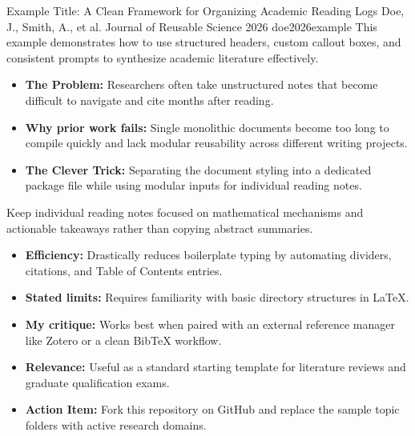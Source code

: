 \begin{paperbox}
  {Example Title: A Clean Framework for Organizing Academic Reading Logs}
  {Doe, J., Smith, A., et al.}
  {Journal of Reusable Science 2026}
  {doe2026example}
  This example demonstrates how to use structured headers, custom callout boxes, and consistent prompts to synthesize academic literature effectively.
\end{paperbox}

\loggap
\begin{itemize}
  \item \textbf{The Problem:} Researchers often take unstructured notes that become difficult to navigate and cite months after reading.
  \item \textbf{Why prior work fails:} Single monolithic documents become too long to compile quickly and lack modular reusability across different writing projects.
\end{itemize}

\logmethod
\begin{itemize}
  \item \textbf{The Clever Trick:} Separating the document styling into a dedicated package file while using modular inputs for individual reading notes.
\end{itemize}

\begin{insightbox}
  Keep individual reading notes focused on mathematical mechanisms and actionable takeaways rather than copying abstract summaries.
\end{insightbox}

\logresults
\begin{itemize}
  \item \textbf{Efficiency:} Drastically reduces boilerplate typing by automating dividers, citations, and Table of Contents entries.
\end{itemize}

\loglimitations
\begin{itemize}
  \item \textbf{Stated limits:} Requires familiarity with basic directory structures in LaTeX.
  \item \textbf{My critique:} Works best when paired with an external reference manager like Zotero or a clean BibTeX workflow.
\end{itemize}

\logtakeaways
\begin{itemize}
  \item \textbf{Relevance:} Useful as a standard starting template for literature reviews and graduate qualification exams.
  \item \textbf{Action Item:} Fork this repository on GitHub and replace the sample topic folders with active research domains.
\end{itemize}